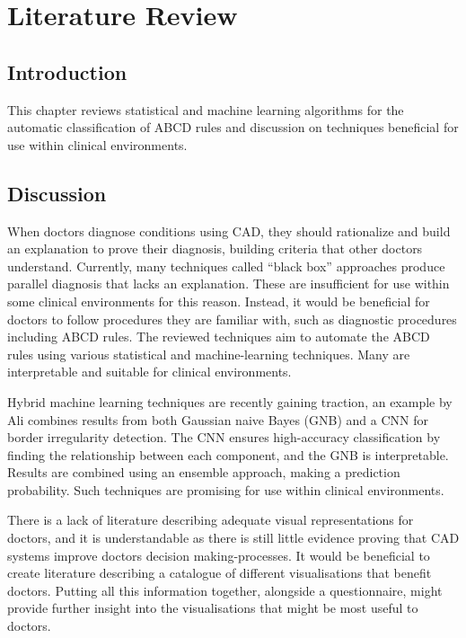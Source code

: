\cleardoublepage
\chapter{Literature Review}

\section{Introduction}
This chapter reviews statistical and machine learning algorithms for the automatic classification of ABCD rules and discussion on techniques beneficial for use within clinical environments.

\section{Discussion}
When doctors diagnose conditions using CAD, they should rationalize and build an explanation to prove their diagnosis, building criteria that other doctors understand. Currently, many techniques\cite{Andre2017} called ``black box'' approaches produce parallel diagnosis that lacks an explanation. These are insufficient for use within some clinical environments for this reason. Instead, it would be beneficial for doctors to follow procedures they are familiar with, such as diagnostic procedures including ABCD rules. The reviewed techniques aim to automate the ABCD rules using various statistical and machine-learning techniques. Many are interpretable and suitable for clinical environments.

Hybrid machine learning techniques are recently gaining traction, an example by Ali combines results from both Gaussian naive Bayes (GNB) and a CNN\cite{Ali2020b} for border irregularity detection. The CNN ensures high-accuracy classification by finding the relationship between each component, and the GNB is interpretable. Results are combined using an ensemble approach, making a prediction probability. Such techniques are promising for use within clinical environments.

There is a lack of literature describing adequate visual representations for doctors, and it is understandable as there is still little evidence proving that CAD systems improve doctors decision making-processes\cite{FerrantediRuffano2018}. It would be beneficial to create literature describing a catalogue of different visualisations that benefit doctors. Putting all this information together, alongside a questionnaire, might provide further insight into the visualisations that might be most useful to doctors.

